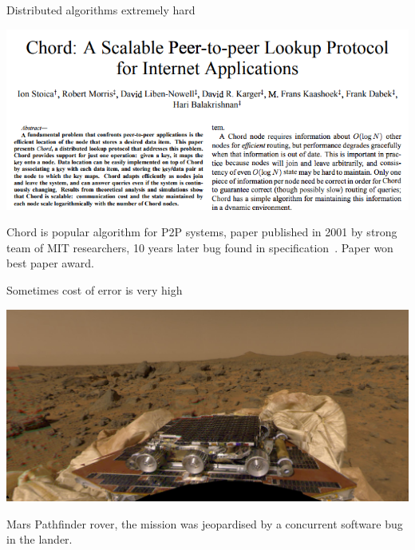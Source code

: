 \documentclass[12pt]{beamer}
\begin{document}
  \begin{frame}{Distributed algorithms extremely hard}
      \begin{center}
          \includegraphics[scale=0.3]{figures/chord_paper.png}
      \end{center}
      \begin{alertblock}{Chord}
          is popular algorithm for P2P systems, paper published in
          2001 by strong team of MIT researchers, 10 years later bug found
          in specification~\cite{stoica2001chord, Zave15}. Paper won best
          paper award.
      \end{alertblock}
  \end{frame}
  \begin{frame}{Sometimes cost of error is very high}
      \begin{center}
          \includegraphics[scale=0.12]{figures/pathfinder.jpg}
      \end{center}
      \begin{alertblock}{Mars Pathfinder}
          rover, the mission was jeopardised by a concurrent
          software bug in the lander.~\cite{Pathfinder2013}
      \end{alertblock}
  \end{frame}
\end{document}
